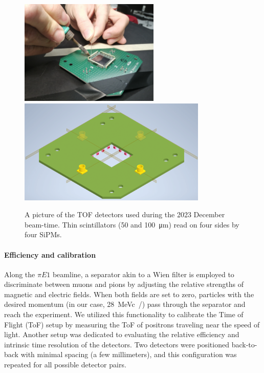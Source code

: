 \begin{refsection}
        \begin{figure}
            \centering
            \includegraphics[height=5cm]{Figures/muEDM_Dec2023/TOF_soldering.jpg}
            \includegraphics[height=5cm]{Figures/muEDM_Dec2023/TOF_CAD.png}
            \caption[muEDM 2023: TOF detector soldering and CAD]{A picture of the TOF detectors used during the 2023 December beam-time. Thin scintillators (50 and \SI{100}{\micro m}) read on four sides by four SiPMs.}
            \label{fig:muEDM:bt2023:TOF:picture}
        \end{figure}

        \paragraph{Efficiency and calibration}
        Along the $\pi E1$ beamline, a separator akin to a Wien filter is employed to discriminate between muons and pions by adjusting the relative strengths of magnetic and electric fields. 
        When both fields are set to zero, particles with the desired momentum (in our case, \SI{28}{MeVc/}) pass through the separator and reach the experiment. 
        We utilized this functionality to calibrate the Time of Flight (ToF) setup by measuring the ToF of positrons traveling near the speed of light.
        Another setup was dedicated to evaluating the relative efficiency and intrinsic time resolution of the detectors. Two detectors were positioned back-to-back with minimal spacing (a few millimeters), and this configuration was repeated for all possible detector pairs.


\end{refsection}
